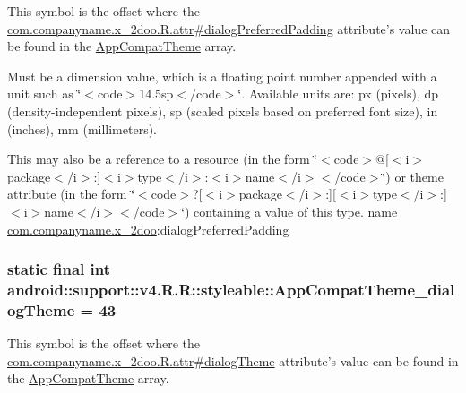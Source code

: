 This symbol is the offset where the \hyperlink{classcom_1_1companyname_1_1x__2doo_1_1_r_1_1attr_f38e57c17b33b1d762131914732d3896}{com.companyname.x\_\-2doo.R.attr\#dialogPreferredPadding} attribute's value can be found in the \hyperlink{classandroid_1_1support_1_1v4_1_1_r_1_1styleable_0873e92ba21076bb5a4aeadeb7f5779f}{AppCompatTheme} array.

Must be a dimension value, which is a floating point number appended with a unit such as \char`\"{}$<$code$>$14.5sp$<$/code$>$\char`\"{}. Available units are: px (pixels), dp (density-independent pixels), sp (scaled pixels based on preferred font size), in (inches), mm (millimeters). 

This may also be a reference to a resource (in the form \char`\"{}$<$code$>$@\mbox{[}$<$i$>$package$<$/i$>$:\mbox{]}$<$i$>$type$<$/i$>$:$<$i$>$name$<$/i$>$$<$/code$>$\char`\"{}) or theme attribute (in the form \char`\"{}$<$code$>$?\mbox{[}$<$i$>$package$<$/i$>$:\mbox{]}\mbox{[}$<$i$>$type$<$/i$>$:\mbox{]}$<$i$>$name$<$/i$>$$<$/code$>$\char`\"{}) containing a value of this type.  name \hyperlink{namespacecom_1_1companyname_1_1x__2doo}{com.companyname.x\_\-2doo}:dialogPreferredPadding \hypertarget{classandroid_1_1support_1_1v4_1_1_r_1_1styleable_7b06171d505e781dc07ea55c3ea49e83}{
\subsubsection[{AppCompatTheme\_\-dialogTheme}]{\setlength{\rightskip}{0pt plus 5cm}static final int android::support::v4.R.R::styleable::AppCompatTheme\_\-dialogTheme = 43}}
\label{classandroid_1_1support_1_1v4_1_1_r_1_1styleable_7b06171d505e781dc07ea55c3ea49e83}


This symbol is the offset where the \hyperlink{classcom_1_1companyname_1_1x__2doo_1_1_r_1_1attr_ce6d55af2d654e2e9cbed5908b964f17}{com.companyname.x\_\-2doo.R.attr\#dialogTheme} attribute's value can be found in the \hyperlink{classandroid_1_1support_1_1v4_1_1_r_1_1styleable_0873e92ba21076bb5a4aeadeb7f5779f}{AppCompatTheme} array.

